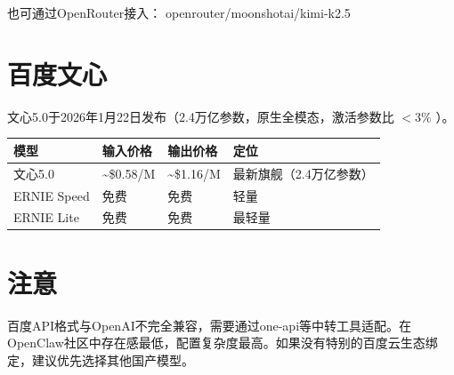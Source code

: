 \documentclass[
  10
]{article}
\newenvironment{Shaded}{}{}
\newcommand{\DataTypeTok}[1]{\textcolor[rgb]{0.56,0.13,0.00}{#1}}
\newcommand{\DecValTok}[1]{\textcolor[rgb]{0.25,0.63,0.44}{#1}}
\newcommand{\NormalTok}[1]{#1}
\newcommand{\OperatorTok}[1]{\textcolor[rgb]{0.40,0.40,0.40}{#1}}
\newcommand{\StringTok}[1]{\textcolor[rgb]{0.25,0.44,0.63}{#1}}
\newcounter{none} %
\begin{document}
\begin{Shaded}
\end{Shaded}

也可通过OpenRouter接入： openrouter/moonshotai/kimi-k2.5

\section{百度文心}\label{ux767eux5ea6ux6587ux5fc3}

文心5.0于2026年1月22日发布（2.4万亿参数，原生全模态，激活参数比
\({ < } 3 \%\) ）。

{\def\LTcaptype{none} %
\begin{longtable}[]{@{}|l|l|l|l|@{}}
\toprule\noalign{}
\endhead
\bottomrule\noalign{}
\endlastfoot
\hline
模型 & 输入价格 & 输出价格 & 定位 \\
\hline
文心5.0 & \textasciitilde\$0.58/M & \textasciitilde\$1.16/M &
最新旗舰（2.4万亿参数） \\
\hline
ERNIE Speed & 免费 & 免费 & 轻量 \\
\hline
ERNIE Lite & 免费 & 免费 & 最轻量 \\
\hline
\end{longtable}
}

\section{注意}\label{ux6ce8ux610f-17}

百度API格式与OpenAI不完全兼容，需要通过one-api等中转工具适配。在OpenClaw社区中存在感最低，配置复杂度最高。如果没有特别的百度云生态绑定，建议优先选择其他国产模型。
\end{document}
